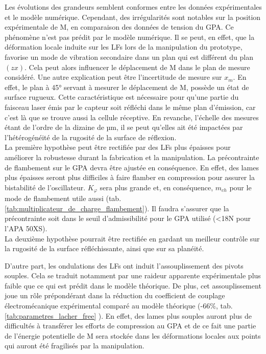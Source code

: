 Les évolutions des grandeurs semblent conformes entre les données expérimentales et le modèle numérique. Cependant, des irrégularités sont notables sur la position expérimentale de M, en comparaison des données de tension du GPA. Ce phénomène n'est pas prédit par le modèle numérique. Il se peut, en effet, que la déformation locale induite sur les LFs lors de la manipulation du prototype, favorise un mode de vibration secondaire dans un plan qui est différent du plan $(zx)$. Cela peut alors influencer le déplacement de M dans le plan de mesure considéré. Une autre explication peut être l'incertitude de mesure sur $x_m$. En effet, le plan à \ang{45} servant à mesurer le déplacement de M, possède un état de surface rugueux. Cette caractéristique est nécessaire pour qu'une partie du faisceau laser émis par le capteur soit réfléchi dans le même plan d'émission, car c'est là que se trouve aussi la cellule réceptive. En revanche, l'échelle des mesures étant de l'ordre de la dizaine de µm, il se peut qu'elles ait été impactées par l'hétérogénéité de la rugosité de la surface de réflexion.\\
La première hypothèse peut être rectifiée par des LFs plus épaisses pour améliorer la robustesse durant la fabrication et la manipulation. La précontrainte de flambement sur le GPA devra être ajustée en conséquence. En effet, des lames plus épaisses seront plus difficiles à faire flamber en compression pour assurer la bistabilité de l'oscillateur. $K_{\varphi}$ sera plus grande et, en conséquence, $m_{ch}$ pour le mode de flambement utile aussi (tab. \ref{tab:multiplicateur_de_charge_flambement}). Il faudra s'assurer que la précontrainte soit dans le seuil d'admissibilité pour le GPA utilisé (<18N pour l'APA 50XS).\\
La deuxième hypothèse pourrait être rectifiée en gardant un meilleur contrôle sur la rugosité de la surface réfléchissante, ainsi que sur sa planéité.

D'autre part, les ondulations des LFs ont induit l'assouplissement des pivots souples. Cela se traduit notamment par une raideur apparente expérimentale plus faible que ce qui est prédit dans le modèle théorique. De plus, cet assouplissement joue un rôle prépondérant dans la réduction du coefficient de couplage électromécanique expérimental comparé au modèle théorique (-66\%, tab. \ref{tab:parametres_lacher_free} ). En effet, des lames plus souples auront plus de difficultés à transférer les efforts de compression au GPA et de ce fait une partie de l'énergie potentielle de M sera stockée dans les déformations locales aux points qui auront été fragilisés par la manipulation.

